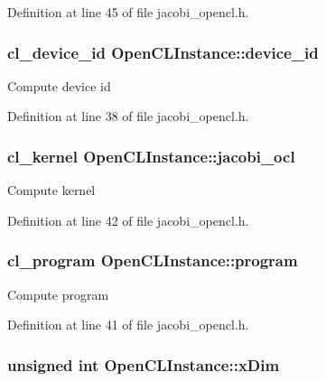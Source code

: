 Definition at line 45 of file jacobi\-\_\-opencl.\-h.

\hypertarget{struct_open_c_l_instance_a22e36a6758529a5000288a7dfb5fd231}{
\subsubsection[{device\-\_\-id}]{\setlength{\rightskip}{0pt plus 5cm}cl\-\_\-device\-\_\-id Open\-C\-L\-Instance\-::device\-\_\-id}}\label{struct_open_c_l_instance_a22e36a6758529a5000288a7dfb5fd231}
Compute device id 

Definition at line 38 of file jacobi\-\_\-opencl.\-h.

\hypertarget{struct_open_c_l_instance_ac97210abd5948c1c67da9a0f7fa6f646}{
\subsubsection[{jacobi\-\_\-ocl}]{\setlength{\rightskip}{0pt plus 5cm}cl\-\_\-kernel Open\-C\-L\-Instance\-::jacobi\-\_\-ocl}}\label{struct_open_c_l_instance_ac97210abd5948c1c67da9a0f7fa6f646}
Compute kernel 

Definition at line 42 of file jacobi\-\_\-opencl.\-h.

\hypertarget{struct_open_c_l_instance_a883163fd9246e6704b1334e69548158c}{
\subsubsection[{program}]{\setlength{\rightskip}{0pt plus 5cm}cl\-\_\-program Open\-C\-L\-Instance\-::program}}\label{struct_open_c_l_instance_a883163fd9246e6704b1334e69548158c}
Compute program 

Definition at line 41 of file jacobi\-\_\-opencl.\-h.

\hypertarget{struct_open_c_l_instance_a19687918b1afb192ab716e277960738f}{
\subsubsection[{x\-Dim}]{\setlength{\rightskip}{0pt plus 5cm}unsigned int Open\-C\-L\-Instance\-::x\-Dim}}\label{struct_open_c_l_instance_a19687918b1afb192ab716e277960738f}


